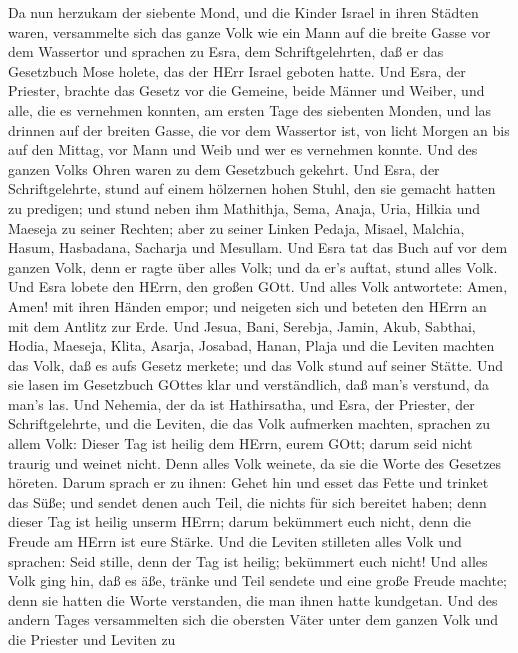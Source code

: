  Da nun herzukam der siebente Mond, und die Kinder Israel in
ihren Städten waren, versammelte sich das ganze Volk wie ein Mann auf
die breite Gasse vor dem Wassertor und sprachen zu Esra, dem
Schriftgelehrten, daß er das Gesetzbuch Mose holete, das der HErr Israel
geboten hatte.  Und Esra, der Priester, brachte das Gesetz
vor die Gemeine, beide Männer und Weiber, und alle, die es vernehmen
konnten, am ersten Tage des siebenten Monden,  und las
drinnen auf der breiten Gasse, die vor dem Wassertor ist, von licht
Morgen an bis auf den Mittag, vor Mann und Weib und wer es vernehmen
konnte. Und des ganzen Volks Ohren waren zu dem Gesetzbuch gekehrt.
 Und Esra, der Schriftgelehrte, stund auf einem hölzernen
hohen Stuhl, den sie gemacht hatten zu predigen; und stund neben ihm
Mathithja, Sema, Anaja, Uria, Hilkia und Maeseja zu seiner Rechten; aber
zu seiner Linken Pedaja, Misael, Malchia, Hasum, Hasbadana, Sacharja und
Mesullam.  Und Esra tat das Buch auf vor dem ganzen Volk,
denn er ragte über alles Volk; und da er's auftat, stund alles Volk.
 Und Esra lobete den HErrn, den großen GOtt. Und alles Volk
antwortete: Amen, Amen! mit ihren Händen empor; und neigeten sich und
beteten den HErrn an mit dem Antlitz zur Erde.  Und Jesua,
Bani, Serebja, Jamin, Akub, Sabthai, Hodia, Maeseja, Klita, Asarja,
Josabad, Hanan, Plaja und die Leviten machten das Volk, daß es aufs
Gesetz merkete; und das Volk stund auf seiner Stätte.  Und
sie lasen im Gesetzbuch GOttes klar und verständlich, daß man's
verstund, da man's las.  Und Nehemia, der da ist
Hathirsatha, und Esra, der Priester, der Schriftgelehrte, und die
Leviten, die das Volk aufmerken machten, sprachen zu allem Volk: Dieser
Tag ist heilig dem HErrn, eurem GOtt; darum seid nicht traurig und
weinet nicht. Denn alles Volk weinete, da sie die Worte des Gesetzes
höreten.  Darum sprach er zu ihnen: Gehet hin und esset das
Fette und trinket das Süße; und sendet denen auch Teil, die nichts für
sich bereitet haben; denn dieser Tag ist heilig unserm HErrn; darum
bekümmert euch nicht, denn die Freude am HErrn ist eure Stärke.
 Und die Leviten stilleten alles Volk und sprachen: Seid
stille, denn der Tag ist heilig; bekümmert euch nicht!  Und
alles Volk ging hin, daß es äße, tränke und Teil sendete und eine große
Freude machte; denn sie hatten die Worte verstanden, die man ihnen hatte
kundgetan.  Und des andern Tages versammelten sich die
obersten Väter unter dem ganzen Volk und die Priester und Leviten zu
